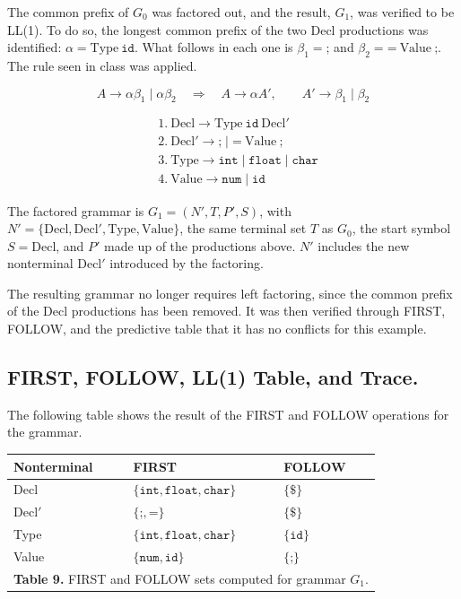 \documentclass[12pt,letterpaper]{article}
\begin{document}
The common prefix of $G_0$ was factored out, and the result, $G_1$, was verified to be LL(1). To do so, the longest common prefix of the two Decl productions was identified: $\alpha = \text{Type}\ \texttt{id}$. What follows in each one is $\beta_1 = \texttt{;}$ and $\beta_2 = \texttt{=}\ \text{Value}\ \texttt{;}$. The rule seen in class was applied.

\[A \to \alpha\beta_1 \mid \alpha\beta_2 \quad\Longrightarrow\quad A \to \alpha A', \qquad A' \to \beta_1 \mid \beta_2\]

\begin{align*}
&1.\ \text{Decl} \rightarrow \text{Type}\ \texttt{id}\ \text{Decl}' \\
&2.\ \text{Decl}' \rightarrow \texttt{;} \mid \texttt{=}\ \text{Value}\ \texttt{;} \\
&3.\ \text{Type} \rightarrow \texttt{int} \mid \texttt{float} \mid \texttt{char} \\
&4.\ \text{Value} \rightarrow \texttt{num} \mid \texttt{id}
\end{align*}

The factored grammar is $G_1 = (N', T, P', S)$, with $N' = \{\text{Decl}, \text{Decl}', \text{Type}, \text{Value}\}$, the same terminal set $T$ as $G_0$, the start symbol $S = \text{Decl}$, and $P'$ made up of the productions above. $N'$ includes the new nonterminal $\text{Decl}'$ introduced by the factoring.

The resulting grammar no longer requires left factoring, since the common prefix of the Decl productions has been removed. It was then verified through FIRST, FOLLOW, and the predictive table that it has no conflicts for this example.

\subsection{FIRST, FOLLOW, LL(1) Table, and Trace.}

The following table shows the result of the FIRST and FOLLOW operations for the grammar.

\begin{center}
\small
\begin{tabular}{@{}l l l@{}}
\toprule
\textbf{Nonterminal} & \textbf{FIRST} & \textbf{FOLLOW} \\
\midrule
Decl & $\{\texttt{int}, \texttt{float}, \texttt{char}\}$ & $\{\$\}$ \\
Decl$'$ & $\{\texttt{;}, \texttt{=}\}$ & $\{\$\}$ \\
Type & $\{\texttt{int}, \texttt{float}, \texttt{char}\}$ & $\{\texttt{id}\}$ \\
Value & $\{\texttt{num}, \texttt{id}\}$ & $\{\texttt{;}\}$ \\
\bottomrule
\multicolumn{3}{c}{\vspace{2pt}\footnotesize \textbf{Table 9.} FIRST and FOLLOW sets computed for grammar $G_1$.} \\
\end{tabular}
\end{center}
\end{document}
